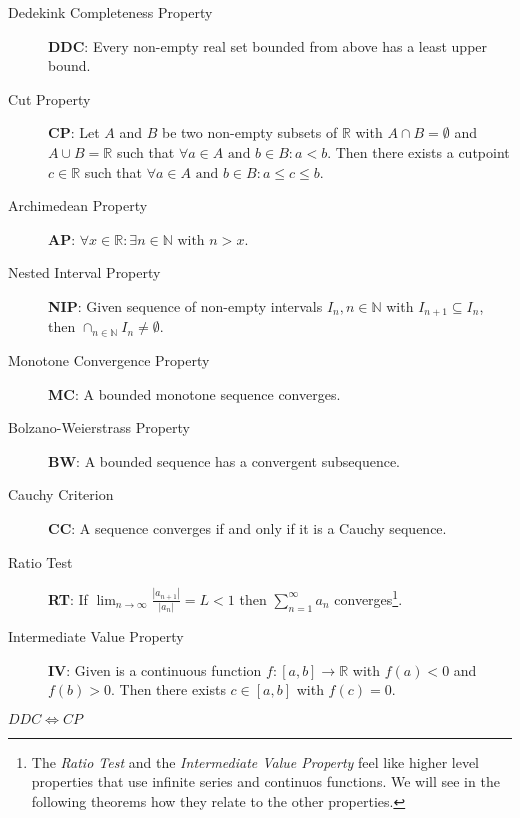 \begin{description}
\item[Dedekink Completeness Property] \textbf{DDC}: Every non-empty real set bounded from above has a least upper bound.
\item[Cut Property] \textbf{CP}: Let $A$ and $B$ be two non-empty subsets of $\mathbb{R}$ with $A \cap B = \emptyset$ and $A \cup B = \mathbb{R}$ such that $\forall a \in A \text{ and } b \in B: a < b$. Then there exists a cutpoint $c \in \mathbb{R}$ such that $\forall a \in A \text{ and } b \in B: a \leq c \leq b$.
\item[Archimedean Property] \textbf{AP}: $\forall x \in \mathbb{R}: \exists n \in \mathbb{N} \text{ with } n > x$.
\item[Nested Interval Property] \textbf{NIP}: Given sequence of non-empty intervals $I_n, n \in \mathbb{N}$ 
with $I_{n+1} \subseteq I_n$, then $\cap_{n \in \mathbb{N}} I_n \neq \emptyset$.
\item[Monotone Convergence Property] \textbf{MC}: A bounded monotone sequence converges.
\item[Bolzano-Weierstrass Property] \textbf{BW}: A bounded sequence has a convergent subsequence.
\item[Cauchy Criterion] \textbf{CC}: A sequence converges if and only if it is a Cauchy sequence.
\item[Ratio Test] \textbf{RT}: If $\lim_{n \to \infty}\frac{|a_{n+1}|}{|a_n|} = L < 1$ then $\sum_{n=1}^{\infty} a_n$ converges\footnote{The \textit{Ratio Test} and the \textit{Intermediate Value Property} feel like higher level properties that use infinite series and continuos functions. We will see in the following theorems how they relate to the other properties.}.
\item[Intermediate Value Property] \textbf{IV}: Given is a continuous function $f:[a, b] \to \mathbb{R}$ with $f(a) < 0$ and $f(b) > 0$. Then there exists $c \in [a, b]$ with $f(c) = 0$.
\end{description}

\begin{thm}
$DDC \Leftrightarrow CP$
\end{thm}

